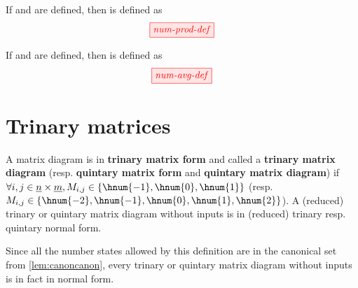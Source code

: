 \begin{definition}
    If  and  are defined, then  is defined as
    $$\tikzfig{num-prod-def}$$
\end{definition}

\begin{definition}
    If  and  are defined, then  is defined as
    $$\tikzfig{num-avg-def}$$
\end{definition}


\section{Trinary matrices}

\begin{definition}
    A matrix diagram  is in \textbf{trinary matrix
    form} and called a \textbf{trinary matrix diagram} (resp. \textbf{quintary
    matrix form} and \textbf{quintary matrix diagram}) if $\forall i,j \in
    \underline{n} \times \underline{m}, M_{i,j} \in \left\{\hnum{-1},
    \hnum{0},\hnum{1}\right\}$ (resp. $M_{i,j} \in \left\{\hnum{-2},\hnum{-1},
    \hnum{0},\hnum{1},\hnum{2}\right\}$). A (reduced) trinary or quintary matrix
    diagram without inputs is in (reduced) trinary resp. quintary normal form.
\end{definition}
\begin{remark}
    Since all the number states allowed by this definition are in the canonical
    set from \autoref{lem:canoncanon}, every trinary or quintary matrix diagram
    without inputs is in fact in normal form.
\end{remark}


